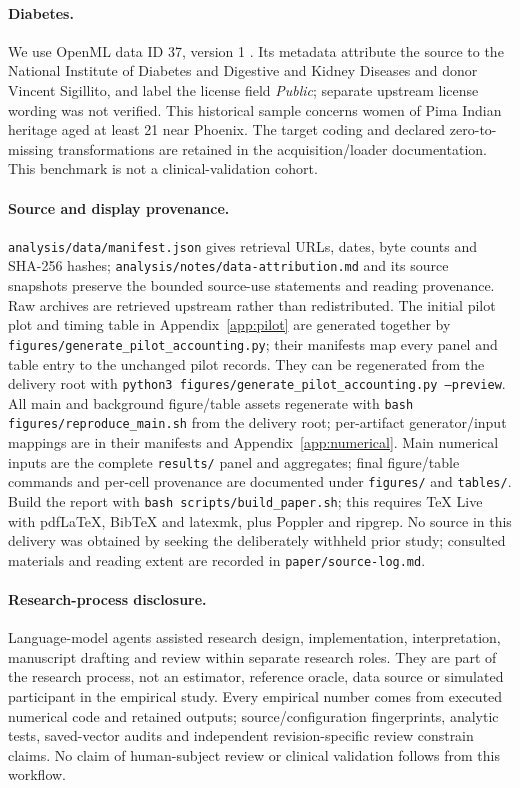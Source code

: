\paragraph{Diabetes.}
We use OpenML data ID 37, version 1 \citep{openml37}. Its metadata attribute the source to the National Institute of Diabetes and Digestive and Kidney Diseases and donor Vincent Sigillito, and label the license field \emph{Public}; separate upstream license wording was not verified. This historical sample concerns women of Pima Indian heritage aged at least 21 near Phoenix. The target coding and declared zero-to-missing transformations are retained in the acquisition/loader documentation. This benchmark is not a clinical-validation cohort.

\paragraph{Source and display provenance.}
\texttt{analysis/data/manifest.json} gives retrieval URLs, dates, byte counts and SHA-256 hashes; \texttt{analysis/notes/data-attribution.md} and its source snapshots preserve the bounded source-use statements and reading provenance. Raw archives are retrieved upstream rather than redistributed. The initial pilot plot and timing table in Appendix~\ref{app:pilot} are generated together by \texttt{figures/generate\_pilot\_accounting.py}; their manifests map every panel and table entry to the unchanged pilot records. They can be regenerated from the delivery root with \texttt{python3 figures/generate\_pilot\_accounting.py --preview}. All main and background figure/table assets regenerate with \texttt{bash figures/reproduce\_main.sh} from the delivery root; per-artifact generator/input mappings are in their manifests and Appendix~\ref{app:numerical}. Main numerical inputs are the complete \texttt{results/} panel and aggregates; final figure/table commands and per-cell provenance are documented under \texttt{figures/} and \texttt{tables/}. Build the report with \texttt{bash scripts/build\_paper.sh}; this requires TeX Live with pdfLaTeX, BibTeX and latexmk, plus Poppler and ripgrep. No source in this delivery was obtained by seeking the deliberately withheld prior study; consulted materials and reading extent are recorded in \texttt{paper/source-log.md}.

\paragraph{Research-process disclosure.}
Language-model agents assisted research design, implementation, interpretation, manuscript drafting and review within separate research roles. They are part of the research process, not an estimator, reference oracle, data source or simulated participant in the empirical study. Every empirical number comes from executed numerical code and retained outputs; source/configuration fingerprints, analytic tests, saved-vector audits and independent revision-specific review constrain claims. No claim of human-subject review or clinical validation follows from this workflow.
